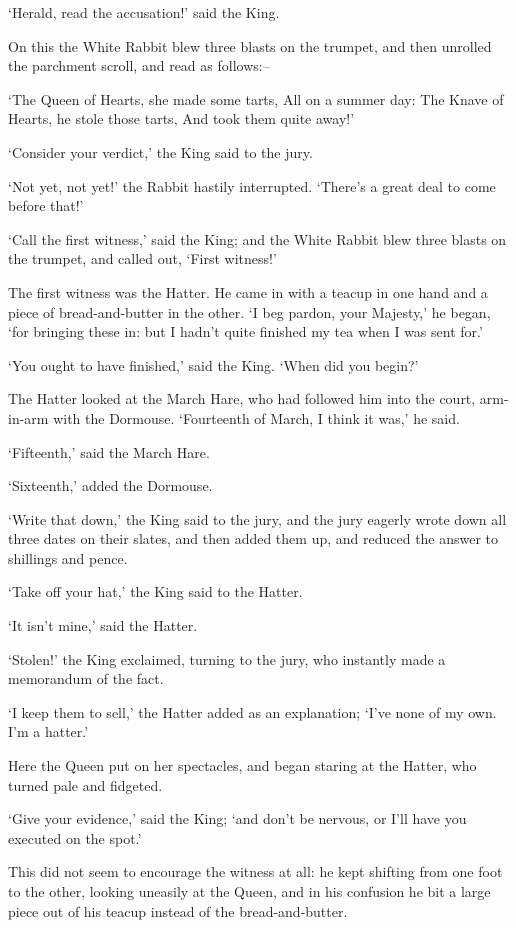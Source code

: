 \documentclass[statementpaper,twoside,openany]{memoir}
\begin{document}
`Herald, read the accusation!' said the King.

On this the White Rabbit blew three blasts on the trumpet, and then unrolled the parchment scroll, and read as follows:--

`The Queen of Hearts, she made some tarts, All on a summer day: The Knave of Hearts, he stole those tarts, And took them quite away!'

`Consider your verdict,' the King said to the jury.

`Not yet, not yet!' the Rabbit hastily interrupted. `There's a great deal to come before that!'

`Call the first witness,' said the King; and the White Rabbit blew three blasts on the trumpet, and called out, `First witness!'

The first witness was the Hatter. He came in with a teacup in one hand and a piece of bread-and-butter in the other. `I beg pardon, your Majesty,' he began, `for bringing these in: but I hadn't quite finished my tea when I was sent for.'

`You ought to have finished,' said the King. `When did you begin?'

The Hatter looked at the March Hare, who had followed him into the court, arm-in-arm with the Dormouse. `Fourteenth of March, I think it was,' he said.

`Fifteenth,' said the March Hare.

`Sixteenth,' added the Dormouse.

`Write that down,' the King said to the jury, and the jury eagerly wrote down all three dates on their slates, and then added them up, and reduced the answer to shillings and pence.

`Take off your hat,' the King said to the Hatter.

`It isn't mine,' said the Hatter.

`Stolen!' the King exclaimed, turning to the jury, who instantly made a memorandum of the fact.

`I keep them to sell,' the Hatter added as an explanation; `I've none of my own. I'm a hatter.'

Here the Queen put on her spectacles, and began staring at the Hatter, who turned pale and fidgeted.

`Give your evidence,' said the King; `and don't be nervous, or I'll have you executed on the spot.'

This did not seem to encourage the witness at all: he kept shifting from one foot to the other, looking uneasily at the Queen, and in his confusion he bit a large piece out of his teacup instead of the bread-and-butter.
\end{document}
